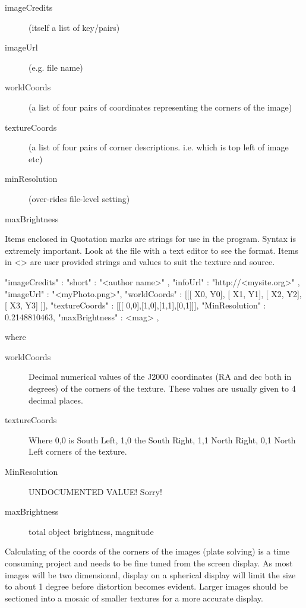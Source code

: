 \begin{description}
  \begin{description}
  \item[imageCredits] (itself a list of key/pairs)
  \item[imageUrl] (e.g. file name)
  \item[worldCoords] (a list of four pairs of coordinates representing the corners of the image)
  \item[textureCoords] (a list of four pairs of corner descriptions. i.e. which is top left of image etc)
  \item[minResolution] (over-rides file-level setting)
  \item[maxBrightness]
  \end{description}
\end{description}

Items enclosed in Quotation marks are strings for use in the program.
Syntax is extremely important. Look at the file with a text editor to
see the format. Items in \textless{}\textgreater{} are user provided
strings and values to suit the texture and source.

\begin{configfile}[\footnotesize]
{
  "imageCredits"  : { "short" : "<author name>" , 
                      "infoUrl" : "http://<mysite.org>" 
                    }, 
  "imageUrl"      : "<myPhoto.png>",
  "worldCoords"   : [[[ X0, Y0], [ X1, Y1], [ X2, Y2], [ X3, Y3] ]], 
  "textureCoords" : [[[ 0,0],[1,0],[1,1],[0,1]]], 
  "MinResolution" : 0.2148810463,
  "maxBrightness" : <mag>
},
\end{configfile}

where 

\begin{description}
\item[worldCoords] Decimal numerical values of the J2000 coordinates (RA and dec both in degrees) of the corners of the texture. These values are usually given to 4 decimal places.
\item[textureCoords]  Where 0,0 is South Left, 1,0 the South Right, 1,1 North Right, 0,1 North Left corners of the texture.
\item[MinResolution] UNDOCUMENTED VALUE! Sorry!%
\item[maxBrightness] total object brightness, magnitude 
\end{description}


Calculating of the coords of the corners of the images (plate solving) is
a time consuming project and needs to be fine tuned from the screen
display. As most images will be two dimensional, display on a spherical
display will limit the size to about 1 degree before distortion becomes
evident. Larger images should be sectioned into a mosaic of smaller
textures for a more accurate display.

